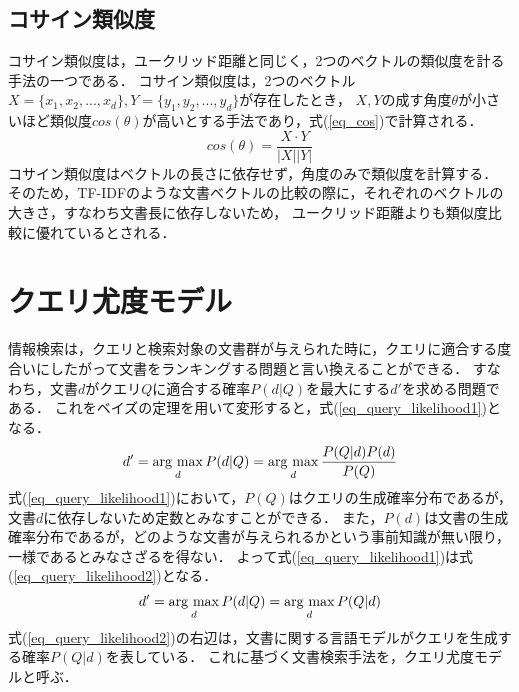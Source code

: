 \subsection{コサイン類似度} \label{sec_cosine}
コサイン類似度は，ユークリッド距離と同じく，2つのベクトルの類似度を計る手法の一つである．
コサイン類似度は，2つのベクトル$X = \{x_1, x_2, ..., x_d\}, Y = \{y_1, y_2, ..., y_d\}$が存在したとき，
$X, Y$の成す角度$\theta$が小さいほど類似度$cos(\theta)$が高いとする手法であり，式(\ref{eq_cos})で計算される．
\begin{equation}
    cos(\theta) = \frac{X \cdot Y}{|X||Y|}  \label{eq_cos}
\end{equation}
コサイン類似度はベクトルの長さに依存せず，角度のみで類似度を計算する．
そのため，TF-IDFのような文書ベクトルの比較の際に，それぞれのベクトルの大きさ，すなわち文書長に依存しないため，
ユークリッド距離よりも類似度比較に優れているとされる．

\section{クエリ尤度モデル}
情報検索は，クエリと検索対象の文書群が与えられた時に，クエリに適合する度合いにしたがって文書をランキングする問題と言い換えることができる．
すなわち，文書$d$がクエリ$Q$に適合する確率$P(d|Q)$を最大にする$d'$を求める問題である．
これをベイズの定理を用いて変形すると，式(\ref{eq_query_likelihood1})となる．
\begin{equation}
    d' = \mathop{\rm arg~max}\limits_{d} P(d|Q) = \mathop{\rm arg~max}\limits_{d} \frac{P(Q|d)P(d)}{P(Q)}    \label{eq_query_likelihood1}
\end{equation}
式(\ref{eq_query_likelihood1})において，$P(Q)$はクエリの生成確率分布であるが，文書$d$に依存しないため定数とみなすことができる．
また，$P(d)$は文書の生成確率分布であるが，どのような文書が与えられるかという事前知識が無い限り，一様であるとみなさざるを得ない．
よって式(\ref{eq_query_likelihood1})は式(\ref{eq_query_likelihood2})となる．
\begin{equation}
    d' = \mathop{\rm arg~max}\limits_{d} P(d|Q) = \mathop{\rm arg~max}\limits_{d} P(Q|d) \label{eq_query_likelihood2}
\end{equation}
式(\ref{eq_query_likelihood2})の右辺は，文書に関する言語モデルがクエリを生成する確率$P(Q|d)$を表している．
これに基づく文書検索手法を，クエリ尤度モデルと呼ぶ．

